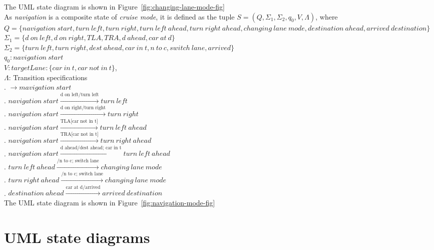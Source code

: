 \documentclass[12pt]{article}
\begin{document}
\begin{spacing}{1.5}
\noindent The UML state diagram is shown in Figure~\ref{fig:changing-lane-mode-fig}\\


\noindent As \textit{navigation} is a composite state of \textit{cruise mode}, it is defined as the tuple $S = (Q, \Sigma_1, \Sigma_2, q_0, V, \Lambda)$, where\\

\noindent $Q = \{navigation~start, turn~left,turn~right, turn~left~ahead, turn~right~ahead, changing~lane~mode,destination~ahead, arrived~destination\}$\\
\noindent $\Sigma_1 = \{d~on~left, d~on~right, TLA, TRA, d~ahead, car~at~d\}$\\
\noindent $\Sigma_2 = \{turn~left, turn~right, dest~ahead, car~in~t, n~to~c, switch~lane, arrived\}$\\
\noindent $q_0: navigation~start$\\
\noindent $V: targetLane: \{car~in~t, car~not~in~t\}$,\\
\noindent $\Lambda$: Transition specifications\\
. $\rightarrow mavigation~start$\\
. $navigation~start\xrightarrow {\text{d on left/turn left}} turn~left$\\
. $navigation~start\xrightarrow {\text{d on right/turn right}} turn~right$\\
. $navigation~start\xrightarrow {\text{TLA[car not in t]}} turn~left~ahead$\\
. $navigation~start\xrightarrow {\text{TRA[car not in t]}} turn~right~ahead$\\
. $navigation~start\xrightarrow {\text{d ahead/dest ahead; car in t}} turn~left~ahead$\\
. $turn~left~ahead\xrightarrow {\text{/n to c; switch lane}} changing~lane~mode$\\
. $turn~right~ahead\xrightarrow {\text{/n to c; switch lane}} changing~lane~mode$\\
. $destination~ahead\xrightarrow {\text{car at d/arrived}} arrived~destination$\\

\noindent The UML state diagram is shown in Figure~\ref{fig:navigation-mode-fig}\\


\newpage

\section{UML state diagrams}


\end{spacing}
\end{document}
